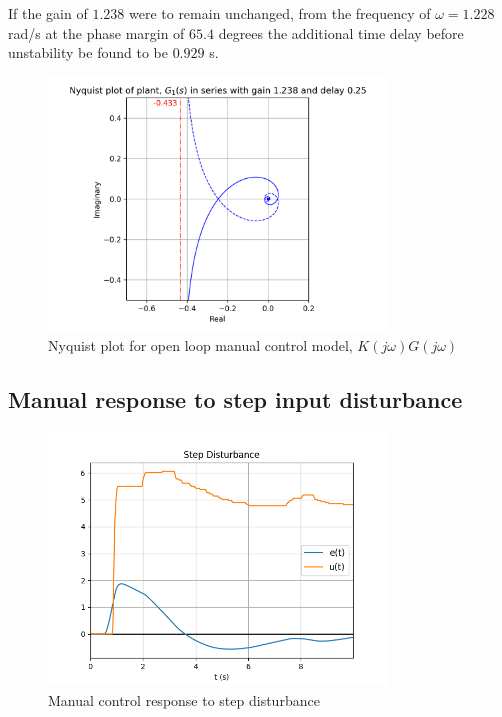 \documentclass[8pt]{article}
\begin{document}
If the gain of $1.238$ were to remain unchanged, from the frequency of $\omega = 1.228$ rad/s at the phase margin of $65.4$ degrees the additional time delay before unstability be found to be $0.929$ s.

\begin{figure}[H]
    \centering
    \includegraphics[width=0.8\textwidth]{figures/nyquist1.png}
    \caption{Nyquist plot for open loop manual control model, $K(j\omega)G(j\omega)$}
    \label{fig:nyquist1}
\end{figure}

\subsection{Manual response to step input disturbance}

\begin{figure}[H]
    \centering
    \includegraphics[width=0.8\textwidth]{figures/FIGURE_3.png}
    \caption{Manual control response to step disturbance}
    \label{fig:figure3}
\end{figure}
\end{document}
